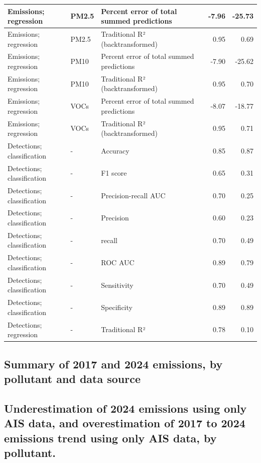 \documentclass[
  letterpaper,
  DIV=11,
  numbers=noendperiod]{scrartcl}
\begin{document}
\begin{table}[!h]
\begin{tabular}[t]{l|l|l|r|r}
\hline
Emissions; regression & PM2.5 & Percent error of total summed predictions & -7.96 & -25.73\\
\hline
Emissions; regression & PM2.5 & Traditional R² (backtransformed) & 0.95 & 0.69\\
\hline
Emissions; regression & PM10 & Percent error of total summed predictions & -7.90 & -25.62\\
\hline
Emissions; regression & PM10 & Traditional R² (backtransformed) & 0.95 & 0.70\\
\hline
Emissions; regression & VOCs & Percent error of total summed predictions & -8.07 & -18.77\\
\hline
Emissions; regression & VOCs & Traditional R² (backtransformed) & 0.95 & 0.71\\
\hline
Detections; classification & - & Accuracy & 0.85 & 0.87\\
\hline
Detections; classification & - & F1 score & 0.65 & 0.31\\
\hline
Detections; classification & - & Precision-recall AUC & 0.70 & 0.25\\
\hline
Detections; classification & - & Precision & 0.60 & 0.23\\
\hline
Detections; classification & - & recall & 0.70 & 0.49\\
\hline
Detections; classification & - & ROC AUC & 0.89 & 0.79\\
\hline
Detections; classification & - & Sensitivity & 0.70 & 0.49\\
\hline
Detections; classification & - & Specificity & 0.89 & 0.89\\
\hline
Detections; regression & - & Traditional R² & 0.78 & 0.10\\
\hline
\end{tabular}
\end{table}

\subsection{Summary of 2017 and 2024 emissions, by pollutant and data
source}\label{summary-of-2017-and-2024-emissions-by-pollutant-and-data-source}

\subsection{Underestimation of 2024 emissions using only AIS data, and
overestimation of 2017 to 2024 emissions trend using only AIS data, by
pollutant.}\label{underestimation-of-2024-emissions-using-only-ais-data-and-overestimation-of-2017-to-2024-emissions-trend-using-only-ais-data-by-pollutant.}
\end{document}
